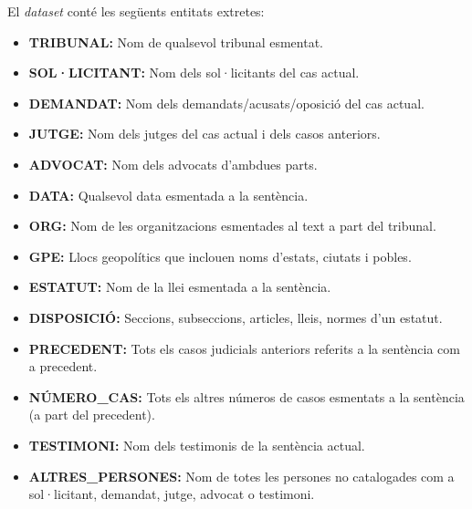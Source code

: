 El \textit{dataset} conté les següents entitats extretes:
\begin{itemize}
  \item \textbf{TRIBUNAL:} Nom de qualsevol tribunal esmentat.
  \item \textbf{SOL·LICITANT:} Nom dels sol·licitants del cas actual.
  \item \textbf{DEMANDAT:} Nom dels demandats/acusats/oposició del cas actual.
  \item \textbf{JUTGE:} Nom dels jutges del cas actual i dels casos anteriors.
  \item \textbf{ADVOCAT:} Nom dels advocats d'ambdues parts.
  \item \textbf{DATA:} Qualsevol data esmentada a la sentència.
  \item \textbf{ORG:} Nom de les organitzacions esmentades al text a part del tribunal.
  \item \textbf{GPE:} Llocs geopolítics que inclouen noms d'estats, ciutats i pobles.
  \item \textbf{ESTATUT:} Nom de la llei esmentada a la sentència.
  \item \textbf{DISPOSICIÓ:} Seccions, subseccions, articles, lleis, normes d'un estatut.
  \item \textbf{PRECEDENT:} Tots els casos judicials anteriors referits a la sentència com a precedent.
  \item \textbf{NÚMERO\_CAS:} Tots els altres números de casos esmentats a la sentència (a part del precedent).
  \item \textbf{TESTIMONI:} Nom dels testimonis de la sentència actual.
  \item \textbf{ALTRES\_PERSONES:} Nom de totes les persones no catalogades com a \linebreak sol·licitant, demandat, jutge, advocat o testimoni.
\end{itemize}


